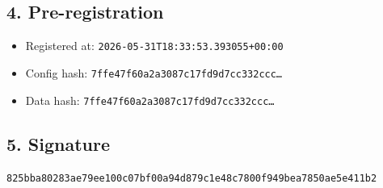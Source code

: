 \documentclass{article}
\begin{document}
\subsection*{4. Pre-registration}
\begin{itemize}
\item Registered at: \texttt{2026-05-31T18:33:53.393055+00:00}
\item Config hash: \texttt{7ffe47f60a2a3087c17fd9d7cc332ccc\dots}
\item Data hash: \texttt{7ffe47f60a2a3087c17fd9d7cc332ccc\dots}
\end{itemize}
\subsection*{5. Signature}
\texttt{825bba80283ae79ee100c07bf00a94d879c1e48c7800f949bea7850ae5e411b2}\\
\end{document}
